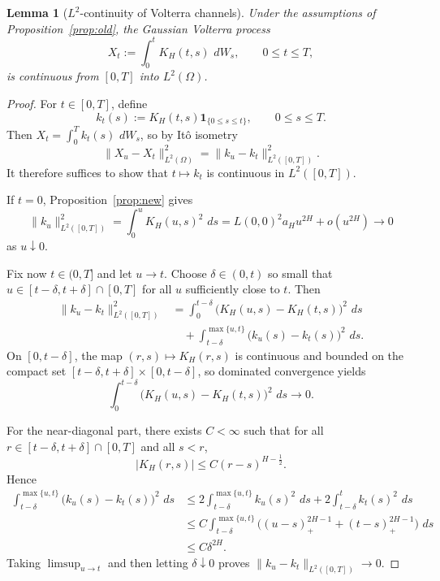 \documentclass[11pt,a4paper]{amsart}
\theoremstyle{plain}
\newtheorem{lemma}[theorem]{Lemma}
\theoremstyle{definition}
\theoremstyle{remark}
\newcommand{\dd}{\,d}
\newcommand{\one}{\mathbf 1}
\begin{document}
\begin{lemma}[$L^2$-continuity of Volterra channels]\label{lem:L2cont}
Under the assumptions of Proposition~\ref{prop:old}, the Gaussian Volterra process
\[
X_t:=\int_0^t K_H(t,s)\,\dd W_s,
\qquad 0\le t\le T,
\]
is continuous from $[0,T]$ into $L^2(\Omega)$.
\end{lemma}

\begin{proof}
For $t\in[0,T]$, define
\[
k_t(s):=K_H(t,s)\one_{\{0\le s\le t\}},
\qquad 0\le s\le T.
\]
Then $X_t=\int_0^T k_t(s)\,\dd W_s$, so by It\^o isometry
\[
\|X_u-X_t\|_{L^2(\Omega)}^2=\|k_u-k_t\|_{L^2([0,T])}^2.
\]
It therefore suffices to show that $t\mapsto k_t$ is continuous in $L^2([0,T])$.

If $t=0$, Proposition~\ref{prop:new} gives
\[
\|k_u\|_{L^2([0,T])}^2
=
\int_0^u K_H(u,s)^2\,\dd s
=
L(0,0)^2a_Hu^{2H}+o(u^{2H})
\longrightarrow 0
\]
as $u\downarrow0$.

Fix now $t\in(0,T]$ and let $u\to t$. Choose $\delta\in(0,t)$ so small that
$u\in[t-\delta,t+\delta]\cap[0,T]$ for all $u$ sufficiently close to $t$. Then
\begin{align*}
\|k_u-k_t\|_{L^2([0,T])}^2
&=
\int_0^{t-\delta}\!\!\bigl(K_H(u,s)-K_H(t,s)\bigr)^2\,\dd s \\
&\quad+
\int_{t-\delta}^{\max\{u,t\}}
\bigl(k_u(s)-k_t(s)\bigr)^2\,\dd s.
\end{align*}
On $[0,t-\delta]$, the map $(r,s)\mapsto K_H(r,s)$ is continuous and bounded on the compact
set $[t-\delta,t+\delta]\times[0,t-\delta]$, so dominated convergence yields
\[
\int_0^{t-\delta}\bigl(K_H(u,s)-K_H(t,s)\bigr)^2\,\dd s\longrightarrow0.
\]

For the near-diagonal part, there exists $C<\infty$ such that for all
$r\in[t-\delta,t+\delta]\cap[0,T]$ and all $s<r$,
\[
|K_H(r,s)|\le C(r-s)^{H-\frac12}.
\]
Hence
\begin{align*}
\int_{t-\delta}^{\max\{u,t\}}\bigl(k_u(s)-k_t(s)\bigr)^2\,\dd s
&\le
2\int_{t-\delta}^{\max\{u,t\}}k_u(s)^2\,\dd s
+2\int_{t-\delta}^{t}k_t(s)^2\,\dd s \\
&\le
C\int_{t-\delta}^{\max\{u,t\}}
\bigl((u-s)_+^{2H-1}+(t-s)_+^{2H-1}\bigr)\,\dd s \\
&\le C\delta^{2H}.
\end{align*}
Taking $\limsup_{u\to t}$ and then letting $\delta\downarrow0$ proves
$\|k_u-k_t\|_{L^2([0,T])}\to0$.
\end{proof}
\end{document}
